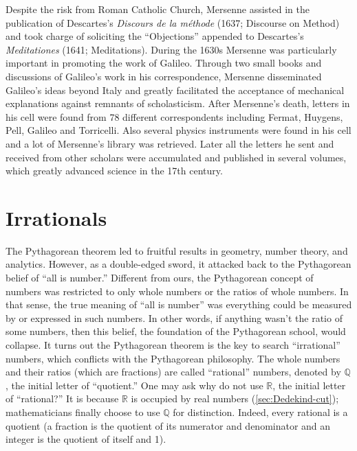\documentclass[b5paper]{article}
\begin{document}
\begin{mdframed}
Despite the risk from Roman Catholic Church, Mersenne assisted in the publication of Descartes's \emph{Discours de la méthode} (1637; Discourse on Method) and took charge of soliciting the \enquote{Objections} appended to Descartes's \emph{Meditationes} (1641; Meditations). During the 1630s Mersenne was particularly important in promoting the work of Galileo. Through two small books and discussions of Galileo's work in his correspondence, Mersenne disseminated Galileo's ideas beyond Italy and greatly facilitated the acceptance of mechanical explanations against remnants of scholasticism\cite{Britannia-2024}. After Mersenne's death, letters in his cell were found from 78 different correspondents including Fermat, Huygens, Pell, Galileo and Torricelli. Also several physics instruments were found in his cell and a lot of Mersenne's library was retrieved. Later all the letters he sent and received from other scholars were accumulated and published in several volumes, which greatly advanced science in the 17th century.
\end{mdframed}

\section{Irrationals} 
The Pythagorean theorem led to fruitful results in geometry, number theory, and analytics. However, as a double-edged sword, it attacked back to the Pythagorean belief of \enquote{all is number.} Different from ours, the Pythagorean concept of numbers was restricted to only whole numbers or the ratios of whole numbers. In that sense, the true meaning of \enquote{all is number} was everything could be measured by or expressed in such numbers. In other words, if anything wasn't the ratio of some numbers, then this belief, the foundation of the Pythagorean school, would collapse. It turns out the Pythagorean theorem is the key to search \enquote{irrational} numbers, which conflicts with the Pythagorean philosophy. The whole numbers and their ratios (which are fractions) are called \enquote{rational} numbers, denoted by $\mathbb{Q}$, the initial letter of \enquote{quotient.} One may ask why do not use $\mathbb{R}$, the initial letter of \enquote{rational?} It is because $\mathbb{R}$ is occupied by real numbers (\cref{sec:Dedekind-cut}); mathematicians finally choose to use $\mathbb{Q}$ for distinction. Indeed, every rational is a quotient (a fraction is the quotient of its numerator and denominator and an integer is the quotient of itself and 1).
\end{document}
